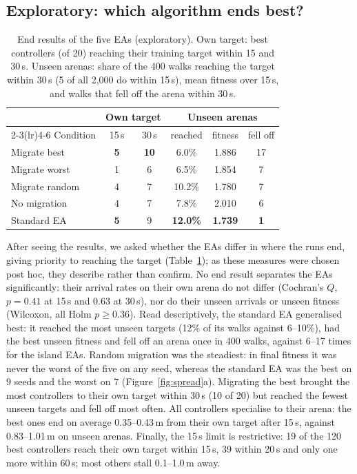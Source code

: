 \documentclass[sigconf]{acmart}
\begin{document}
\subsection{Exploratory: which algorithm ends best?}
\label{sec:end}

\begin{table}[t]
  \caption{End results of the five EAs (exploratory). Own target: best
  controllers (of 20) reaching their training target within 15 and 30\,s.
  Unseen arenas: share of the 400 walks reaching the target within 30\,s (5 of
  all 2{,}000 do within 15\,s), mean fitness over 15\,s, and walks that fell
  off the arena within 30\,s.}
  \label{tab:end}
  \small
  \setlength{\tabcolsep}{4pt}
  \begin{tabular}{lccccc}
    \toprule
    & \multicolumn{2}{c}{Own target} & \multicolumn{3}{c}{Unseen arenas} \\
    \cmidrule(lr){2-3}\cmidrule(lr){4-6}
    Condition & 15\,s & 30\,s & reached & fitness & fell off \\
    \midrule
    Migrate best   & \textbf{5} & \textbf{10} & 6.0\% & 1.886 & 17 \\
    Migrate worst  & 1 & 6 & 6.5\% & 1.854 & 7 \\
    Migrate random & 4 & 7 & 10.2\% & 1.780 & 7 \\
    No migration   & 4 & 7 & 7.8\% & 2.010 & 6 \\
    Standard EA    & \textbf{5} & 9 & \textbf{12.0\%} & \textbf{1.739} & \textbf{1} \\
    \bottomrule
  \end{tabular}
\end{table}

After seeing the results, we asked whether the EAs differ in where the runs
end, giving priority to reaching the target (Table~\ref{tab:end}); as these
measures were chosen post hoc, they describe rather than confirm. No end
result separates the EAs significantly: their
arrival rates on their own arena do not differ (Cochran's $Q$, $p = 0.41$ at
15\,s and 0.63 at 30\,s), nor do their unseen arrivals or unseen fitness
(Wilcoxon, all Holm $p \geq 0.36$). Read descriptively, the standard EA
generalised best: it reached the most unseen targets (12\% of its walks against
6--10\%), had the best unseen fitness and fell off an arena once in 400 walks,
against 6--17 times for the island EAs. Random migration was the steadiest: in
final fitness it was never the worst of the five on any seed, whereas the
standard EA was the best on 9 seeds and the worst on 7
(Figure~\ref{fig:spread}a). Migrating the best brought the most controllers to
their own target within 30\,s (10 of 20) but reached the fewest unseen targets
and fell off most often. All controllers specialise to their arena: the best ones end on average 0.35--0.43\,m from
their own target after 15\,s, against 0.83--1.01\,m on unseen arenas. Finally,
the 15\,s limit is restrictive: 19 of the 120 best controllers reach their own
target within 15\,s, 39 within 20\,s and only one more within 60\,s; most
others stall 0.1--1.0\,m away.
\end{document}
